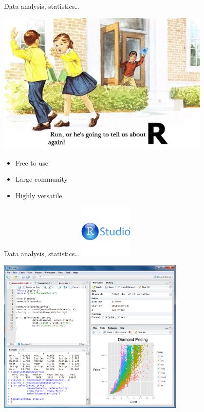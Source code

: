 \documentclass[10pt]{beamer}%
\begin{document}
\begin{frame}{Data analysis, statistics\dots }
\begin{center}
\includegraphics[width=0.8\textwidth]{Figures/ralert}
\end{center}
\begin{itemize}
 \item Free to use
\item Large community
\item Highly versatile
\end{itemize}
\end{frame}

\begin{frame}{Data analysis, statistics\dots }
\includegraphics[width=0.2\textwidth]{Figures/rsname}
\vspace{-0.5cm}

\centering
\includegraphics[width=0.7\textwidth]{Figures/Rstudio2}
\end{frame}
\end{document}
